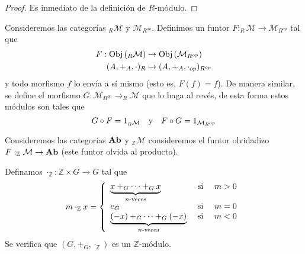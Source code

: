 \documentclass[12pt]{report}
\newcounter{it}
\theoremstyle{largebreak}
\newcommand\cf[3]{\ensuremath{#1:#2\rightarrow#3}}
\newcommand{\Obj}[1]{\ensuremath{\textup{Obj}\left(#1\right)}}
\newcommand{\Cat}[1]{\ensuremath{\textup{\textbf{#1}}}}
\begin{document}
    \begin{proof}
        Es inmediato de la definición de $R$-módulo.
    \end{proof}

    \begin{exa}
        Consideremos las categorías $_R\mathcal{M}$ y $\mathcal{M}_{R^{op}}$. Definimos un funtor $\cf{F}{_R\mathcal{M}}{\mathcal{M}_{R^{op}}}$ tal que
        \begin{equation*}
            \begin{split}
                F:\Obj{_R\mathcal{M}}&\rightarrow\Obj{\mathcal{M}_{R^{op}}}\\
                (A,+_A,\cdot)_R&\mapsto(A,+_A,\cdot_{op})_{R^{op}}\\
            \end{split}
        \end{equation*}
        y todo morfismo $f$ lo envía a sí mismo (esto es, $F(f)=f$). De manera similar, se define el morfismo $\cf{G}{\mathcal{M}_{R^{op}}}{_R\mathcal{M}}$ que lo haga al revés, de esta forma estos módulos son tales que
        \begin{equation*}
            G\circ F=1_{_R\mathcal{M}}\quad\textup{y}\quad F\circ G=1_{\mathcal{M}_{R^{op}}}
        \end{equation*}
    \end{exa}

    \begin{exa}
        Consideremos las categorías $\Cat{Ab}$ y $_{\mathbb{Z}}\mathcal{M}$ consideremos el funtor olvidadizo $\cf{F}{_{\mathbb{Z}}\mathcal{M}}{\Cat{Ab}}$ (este funtor olvida al producto).

        Definamos $\cf{\cdot_{\mathbb{Z}}}{\mathbb{Z}\times G}{G}$ tal que
        \begin{equation*}
            m\cdot_{\mathbb{Z}}x=\left\{
                \begin{array}{lcr}
                    \underbrace{x+_G\cdots+_Gx}_{n\textup{-veces}} & \textup{ si } & m>0\\
                    e_G & \textup{ si } & m=0\\
                    \underbrace{(-x)+_G\cdots+_G(-x)}_{n\textup{-veces}} & \textup{ si } & m<0\\
                \end{array}
            \right.
        \end{equation*}
        Se verifica que $(G,+_G,\cdot_{\mathbb{Z}})$ es un $\mathbb{Z}$-módulo.
    \end{exa}
\end{document}
